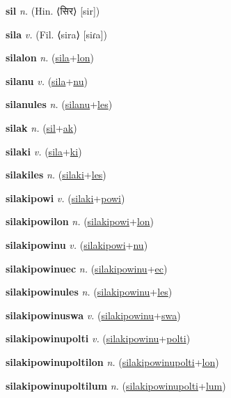 \textbf{\hypertarget{sil}{sil}} \textit{n.} (Hin. ⟨{\devanagari{}सिर}⟩ [sir])


\textbf{\hypertarget{sila}{sila}} \textit{v.} (Fil. ⟨sira⟩ [siɾa])


\textbf{\hypertarget{silalon}{silalon}} \textit{n.} (\hyperlink{sila}{sila}+\allowbreak \hyperlink{lon}{lon})


\textbf{\hypertarget{silanu}{silanu}} \textit{v.} (\hyperlink{sila}{sila}+\allowbreak \hyperlink{nu}{nu})


\textbf{\hypertarget{silanules}{silanules}} \textit{n.} (\hyperlink{silanu}{silanu}+\allowbreak \hyperlink{les}{les})


\textbf{\hypertarget{silak}{silak}} \textit{n.} (\hyperlink{sil}{sil}+\allowbreak \hyperlink{ak}{ak})


\textbf{\hypertarget{silaki}{silaki}} \textit{v.} (\hyperlink{sila}{sila}+\allowbreak \hyperlink{ki}{ki})


\textbf{\hypertarget{silakiles}{silakiles}} \textit{n.} (\hyperlink{silaki}{silaki}+\allowbreak \hyperlink{les}{les})


\textbf{\hypertarget{silakipowi}{silakipowi}} \textit{v.} (\hyperlink{silaki}{silaki}+\allowbreak \hyperlink{powi}{powi})


\textbf{\hypertarget{silakipowilon}{silakipowilon}} \textit{n.} (\hyperlink{silakipowi}{silakipowi}+\allowbreak \hyperlink{lon}{lon})


\textbf{\hypertarget{silakipowinu}{silakipowinu}} \textit{v.} (\hyperlink{silakipowi}{silakipowi}+\allowbreak \hyperlink{nu}{nu})


\textbf{\hypertarget{silakipowinuec}{silakipowinuec}} \textit{n.} (\hyperlink{silakipowinu}{silakipowinu}+\allowbreak \hyperlink{ec}{ec})


\textbf{\hypertarget{silakipowinules}{silakipowinules}} \textit{n.} (\hyperlink{silakipowinu}{silakipowinu}+\allowbreak \hyperlink{les}{les})


\textbf{\hypertarget{silakipowinuswa}{silakipowinuswa}} \textit{v.} (\hyperlink{silakipowinu}{silakipowinu}+\allowbreak \hyperlink{swa}{swa})


\textbf{\hypertarget{silakipowinupolti}{silakipowinupolti}} \textit{v.} (\hyperlink{silakipowinu}{silakipowinu}+\allowbreak \hyperlink{polti}{polti})


\textbf{\hypertarget{silakipowinupoltilon}{silakipowinupoltilon}} \textit{n.} (\hyperlink{silakipowinupolti}{silakipowinupolti}+\allowbreak \hyperlink{lon}{lon})


\textbf{\hypertarget{silakipowinupoltilum}{silakipowinupoltilum}} \textit{n.} (\hyperlink{silakipowinupolti}{silakipowinupolti}+\allowbreak \hyperlink{lum}{lum})


